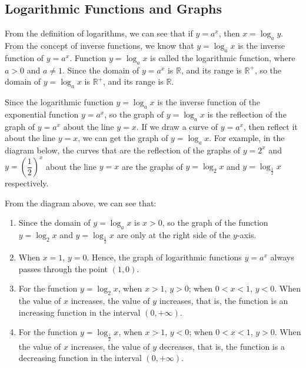 \documentclass[12pt]{report}
\begin{document}
\subsection*{Logarithmic Functions and Graphs}

From the definition of logarithms, we can see that if $y = a^x$, then $x =
  \log_a y$. From the concept of inverse functions, we know that $y = \log_a x$
is the inverse function of $y = a^x$. Function $y = \log_a x$ is called the
logarithmic function, where $a > 0$ and $a \neq 1$. Since the domain of $y =
  a^x$ is $\mathbb{R}$, and its range is $\mathbb{R}^+$, so the domain of $y =
  \log_a x$ is $\mathbb{R}^+$, and its range is $\mathbb{R}$.

Since the logarithmic function $y = \log_a x$ is the inverse function of the
exponential function $y = a^x$, so the graph of $y = \log_a x$ is the
reflection of the graph of $y = a^x$ about the line $y = x$. If we draw a curve
of $y = a^x$, then reflect it about the line $y = x$, we can get the graph of
$y = \log_a x$. For example, in the diagram below, the curves that are the
reflection of the graphs of $y = 2^x$ and $y = \left(\dfrac{1}{2}\right)^x$
about the line $y = x$ are the graphs of $y = \log_2 x$ and $y =
  \log_\frac{1}{2} x$ respectively.

From the diagram above, we can see that:
\begin{enumerate}[label=(\arabic*)]
  \item Since the domain of $y = \log_a x$ is $x > 0$, so the graph of the function $y
          = \log_2 x$ and $y = \log_\frac{1}{2} x$ are only at the right side of the
        $y$-axis.
  \item When $x = 1$, $y = 0$. Hence, the graph of logarithmic functions $y = a^x$
        always passes through the point $(1, 0)$.

  \item For the function $y = \log_2 x$, when $x > 1$, $y > 0$; when $0 < x < 1$, $y <
          0$. When the value of $x$ increases, the value of $y$ increases, that is, the
        function is an increasing function in the interval $(0, +\infty)$.

  \item For the function $y = \log_\frac{1}{2} x$, when $x > 1$, $y < 0$; when $0 < x <
          1$, $y > 0$. When the value of $x$ increases, the value of $y$ decreases, that
        is, the function is a decreasing function in the interval $(0, +\infty)$.
\end{enumerate}
\end{document}
